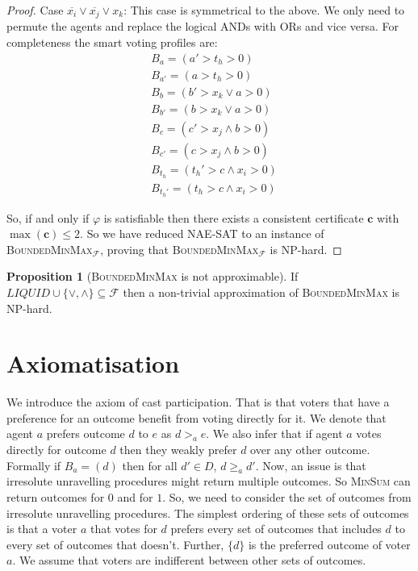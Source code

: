 \documentclass[11pt,a4paper, titlepage]{article}
\theoremstyle{definition}
\newtheorem{proposition}[theorem]{Proposition}
\let\vec\mathbf
\begin{document}
\begin{proof}
    Case $\overline{x_i} \lor \overline{x_j} \lor x_k$: This case is symmetrical to the above. We only need to permute the agents and replace the logical ANDs with ORs and vice versa. For completeness the smart voting profiles are:     \begin{align*}
        &B_a = (a' > t_h > 0) \\
        &B_{a'} = (a > t_h > 0) \\
        &B_{b} = (b' > x_k \lor a > 0) \\
        &B_{b'} = (b > x_k \lor a > 0) \\
        &B_{c} = (c' > x_j \land b > 0) \\
        &B_{c'} = (c > x_j \land b > 0) \\
        &B_{t_h} = (t_h' > c \land x_i > 0) \\
        &B_{t_h'} = (t_h > c \land x_i > 0)
    \end{align*}

    So, if and only if $\varphi$ is satisfiable then there exists a consistent certificate $\vec{c}$ with $\max(\vec{c}) \leq 2$. So we have reduced \textsc{NAE-SAT} to an instance of \textsc{BoundedMinMax}$_\mathcal{F}$, proving that \textsc{BoundedMinMax}$_\mathcal{F}$ is NP-hard.
\end{proof}



\begin{proposition}[\textsc{BoundedMinMax} is not approximable]
    If $\mathit{LIQUID} \cup \{\lor, \land\} \subseteq \mathcal{F}$ then a non-trivial approximation of \textsc{BoundedMinMax} is NP-hard.
\end{proposition}

\newpage
\section{Axiomatisation}

We introduce the axiom of cast participation. That is that voters that have a preference for an outcome benefit from voting directly for it. We denote that agent $a$ prefers outcome $d$ to $e$ as $d >_a e$. We also infer that if agent $a$ votes directly for outcome $d$ then they weakly prefer $d$ over any other outcome. Formally if $B_a = (d)$ then for all $d' \in D$, $d \geq_a d'$.
Now, an issue is that irresolute unravelling procedures might return multiple outcomes. So \textsc{MinSum} can return outcomes for $0$ and for $1$.
So, we need to consider the set of outcomes from irresolute unravelling procedures. The simplest ordering of these sets of outcomes is that a voter $a$ that votes for $d$ prefers every set of outcomes that includes $d$ to every set of outcomes that doesn't. Further, $\{d\}$ is the preferred outcome of voter $a$. We assume that voters are indifferent between other sets of outcomes. 
\end{document}
